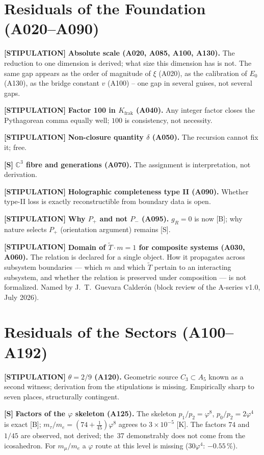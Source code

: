 \section{Residuals of the Foundation (A020--A090)}

\textbf{[STIPULATION]} \textbf{Absolute scale (A020, A085, A100, A130).}
The reduction to one dimension is derived; what size this dimension has is not.
The same gap appears as the order of magnitude of $\xi$ (A020), as the
calibration of $E_0$ (A130), as the bridge constant $v$ (A100) -- one gap in
several guises, not several gaps.

\textbf{[STIPULATION]} \textbf{Factor 100 in $K_\text{frak}$ (A040).}
Any integer factor closes the Pythagorean comma equally well; $100$ is
consistency, not necessity.

\textbf{[STIPULATION]} \textbf{Non-closure quantity $\delta$ (A050).}
The recursion cannot fix it; free.

\textbf{[S]} \textbf{$\mathbb{C}^3$ fibre and generations (A070).}
The assignment is interpretation, not derivation.

\textbf{[STIPULATION]} \textbf{Holographic completeness type II (A090).}
Whether type-II loss is exactly reconstructible from boundary data is open.

\textbf{[STIPULATION]} \textbf{Why $P_+$ and not $P_-$ (A095).}
$g_R=0$ is now [B]; why nature selects $P_+$ (orientation argument) remains [S].

\textbf{[STIPULATION]} \textbf{Domain of $\tilde{T}\cdot m=1$ for
composite systems (A030, A060).}
The relation is declared for a single object. How it propagates across
subsystem boundaries --- which $m$ and which $\tilde{T}$ pertain to an
interacting subsystem, and whether the relation is preserved under
composition --- is not formalized. Named by J.~T.~Guevara Calderón
(block review of the A-series v1.0, July 2026).

\section{Residuals of the Sectors (A100--A192)}

\textbf{[STIPULATION]} \textbf{$\theta=2/9$ (A120).} Geometric source
$C_3\subset A_5$ known as a second witness; derivation from the stipulations is
missing. Empirically sharp to seven places, structurally contingent.

\textbf{[S]} \textbf{Factors of the $\varphi$ skeleton (A125).} The skeleton
$p_1/p_2=\varphi^8$, $p_0/p_2=2\varphi^4$ is exact [B];
$m_\tau/m_e=(74+\tfrac1{45})\varphi^8$ agrees to $3\times10^{-5}$ [K]. The
factors $74$ and $1/45$ are observed, not derived; the~37 demonstrably does not
come from the icosahedron. For $m_\mu/m_e$ a $\varphi$ route at this level is
missing ($30\varphi^4$: $-0{.}55\,\%$).

